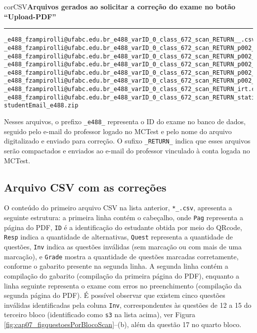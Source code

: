 \begin{myboxCode}{corCSV}{\textbf{Arquivos gerados ao solicitar a correção do exame no botão ``Upload-PDF''}}\vspace{3mm}
\hrule
\begin{verbatim}
_e488_fzampirolli@ufabc.edu.br_e488_varID_0_class_672_scan_RETURN__.csv
_e488_fzampirolli@ufabc.edu.br_e488_varID_0_class_672_scan_RETURN_p002_s3_q002.png
_e488_fzampirolli@ufabc.edu.br_e488_varID_0_class_672_scan_RETURN_p002_s3_q003.png
_e488_fzampirolli@ufabc.edu.br_e488_varID_0_class_672_scan_RETURN_p002_s3_q004.png
_e488_fzampirolli@ufabc.edu.br_e488_varID_0_class_672_scan_RETURN_p002_s3_q005.png
_e488_fzampirolli@ufabc.edu.br_e488_varID_0_class_672_scan_RETURN_p002_s4_q001_D_OK.png
_e488_fzampirolli@ufabc.edu.br_e488_varID_0_class_672_scan_RETURN_irt.csv
_e488_fzampirolli@ufabc.edu.br_e488_varID_0_class_672_scan_RETURN_statistics.csv
studentEmail_e488.zip
\end{verbatim}
\end{myboxCode}

Nesses arquivos, o prefixo \verb|_e488_| representa o ID do exame no banco de dados, seguido pelo e-mail do professor logado no MCTest e pelo nome do arquivo digitalizado e enviado para correção. O sufixo \verb|_RETURN_| indica que esses arquivos serão compactados e enviados ao e-mail do professor vinculado à conta logada no MCTest. 

\subsection{Arquivo CSV com as correções}\label{sec:CSVcorrecoesQR}

O conteúdo do primeiro arquivo CSV na lista anterior, \verb|*_.csv|, apresenta a seguinte estrutura: a primeira linha contém o cabeçalho, onde \verb|Pag| representa a página do PDF, \verb|ID| é a identificação do estudante obtida por meio do QRcode, \verb|Resp| indica a quantidade de alternativas, \verb|Quest| representa a quantidade de questões, \verb|Inv| indica as questões inválidas (sem marcação ou com mais de uma marcação), e \verb|Grade| mostra a quantidade de questões marcadas corretamente, conforme o gabarito presente na segunda linha. A segunda linha contém a compilação do gabarito (compilação da primeira página do PDF), enquanto a linha seguinte representa o exame com erros no preenchimento (compilação da segunda página do PDF). É possível observar que existem cinco questões inválidas identificadas pela coluna \verb|Inv|, correspondentes às questões de 12 a 15 do terceiro bloco (identificado como \verb|s3| na lista acima), ver Figura \ref{fig:cap07_figquestoesPorBlocoScan}--(b), além da questão 17 no quarto bloco. 

